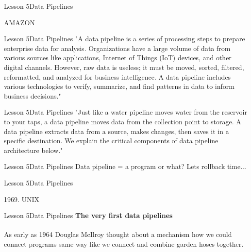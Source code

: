 \documentclass[aspectratio=1610]{beamer}
\begin{document}
\begin{frame}
\end{frame}


\begin{frame}{Lesson 5}{Data Pipelines}
\Huge
\begin{center}
AMAZON
\end{center}
\end{frame}


\begin{frame}{Lesson 5}{Data Pipelines}
\LARGE
"A data pipeline is a series of processing steps to prepare 
enterprise data for analysis. Organizations have a large volume of 
data from various sources like applications, Internet of Things (IoT)
devices, and other digital channels. However, raw data is useless; it
must be moved, sorted, filtered, reformatted, and analyzed for
business intelligence. A data pipeline includes various technologies
to verify, summarize, and find patterns in data to inform business 
decisions."
\end{frame}


\begin{frame}{Lesson 5}{Data Pipelines}
\LARGE
"Just like a water pipeline moves water from the reservoir to your
taps, a data pipeline moves data from the collection point to
storage. A data pipeline extracts data from a source, makes changes,
then saves it in a specific destination. We explain the critical
components of data pipeline architecture below."
\end{frame}


\begin{frame}
\end{frame}


\begin{frame}{Lesson 5}{Data Pipelines}
\Huge
 Data pipeline = a program or what? Lets rollback time... 
 \end{frame}


\begin{frame}{Lesson 5}{Data Pipelines}
\Huge
\begin{center}
1969. UNIX 
\end{center}
\end{frame}

\begin{frame}{Lesson 5}{Data Pipelines}
\LARGE
\textbf{The very first data pipelines}\\~\\
As early as 1964 Douglas McIlroy thought about a mechanism how we 
could connect programs same way like we connect and combine
garden hoses together. 
\end{frame}
\end{document}

